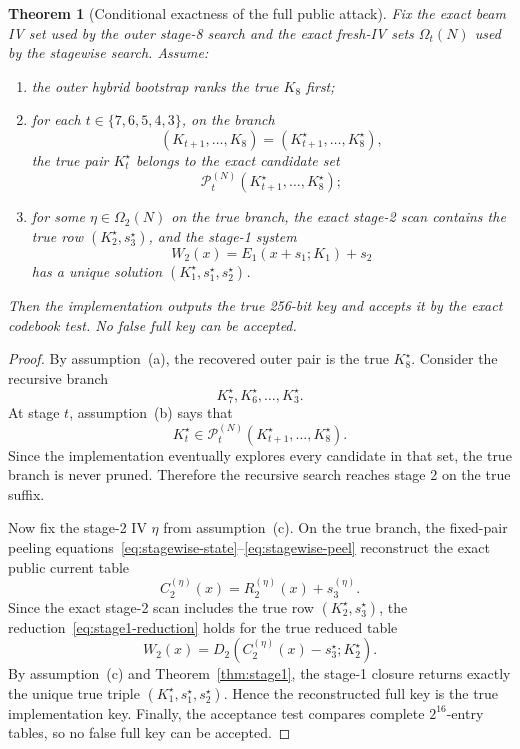 \documentclass[11pt]{article}
\newtheorem{theorem}{Theorem}
\begin{document}
\begin{theorem}[Conditional exactness of the full public attack]
\label{thm:main}
Fix the exact beam IV set used by the outer stage-8 search and the exact fresh-IV sets $\Omega_t(N)$ used by the stagewise search. Assume:
\begin{enumerate}[label=(\alph*),leftmargin=1.5em]
\item the outer hybrid bootstrap ranks the true $K_8$ first;
\item for each $t\in\{7,6,5,4,3\}$, on the branch
\[
(K_{t+1},\dots,K_8)=(K_{t+1}^{\star},\dots,K_8^{\star}),
\]
the true pair $K_t^{\star}$ belongs to the exact candidate set
\[
\mathcal{P}_t^{(N)}(K_{t+1}^{\star},\dots,K_8^{\star});
\]
\item for some $\eta\in\Omega_2(N)$ on the true branch, the exact stage-2 scan contains the true row $(K_2^{\star},s_3^{\star})$, and the stage-1 system
\[
W_2(x)=E_1(x+s_1;K_1)+s_2
\]
has a unique solution $(K_1^{\star},s_1^{\star},s_2^{\star})$.
\end{enumerate}
Then the implementation outputs the true 256-bit key and accepts it by the exact codebook test. No false full key can be accepted.
\end{theorem}

\begin{proof}
By assumption~(a), the recovered outer pair is the true $K_8^{\star}$. Consider the recursive branch
\[
K_7^{\star},K_6^{\star},\dots,K_3^{\star}.
\]
At stage $t$, assumption~(b) says that
\[
K_t^{\star}\in \mathcal{P}_t^{(N)}(K_{t+1}^{\star},\dots,K_8^{\star}).
\]
Since the implementation eventually explores every candidate in that set, the true branch is never pruned. Therefore the recursive search reaches stage 2 on the true suffix.

Now fix the stage-2 IV $\eta$ from assumption~(c). On the true branch, the fixed-pair peeling equations~\eqref{eq:stagewise-state}--\eqref{eq:stagewise-peel} reconstruct the exact public current table
\[
C_2^{(\eta)}(x)=R_2^{(\eta)}(x)+s_3^{(\eta)}.
\]
Since the exact stage-2 scan includes the true row $(K_2^{\star},s_3^{\star})$, the reduction~\eqref{eq:stage1-reduction} holds for the true reduced table
\[
W_2(x)=D_2(C_2^{(\eta)}(x)-s_3^{\star};K_2^{\star}).
\]
By assumption~(c) and Theorem~\ref{thm:stage1}, the stage-1 closure returns exactly the unique true triple $(K_1^{\star},s_1^{\star},s_2^{\star})$. Hence the reconstructed full key is the true implementation key. Finally, the acceptance test compares complete $2^{16}$-entry tables, so no false full key can be accepted.
\end{proof}
\end{document}
